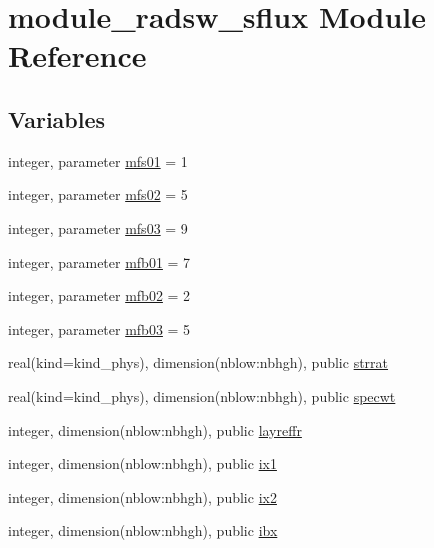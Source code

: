 \hypertarget{namespacemodule__radsw__sflux}{}\section{module\+\_\+radsw\+\_\+sflux Module Reference}
\label{namespacemodule__radsw__sflux}
\subsection*{Variables}
\begin{DoxyCompactItemize}
\item 
integer, parameter \hyperlink{namespacemodule__radsw__sflux_aba08e6f9d4dccd130e87300e6fd0ed58}{mfs01} = 1
\item 
integer, parameter \hyperlink{group__module__radsw__main_gacca3bbc0dd125a3e8c3734c58c48e79b}{mfs02} = 5
\item 
integer, parameter \hyperlink{group__module__radsw__main_ga5bd55a5106ce82bd47250d38d9b8f22a}{mfs03} = 9
\item 
integer, parameter \hyperlink{group__module__radsw__main_ga08a0f1278962ac27634169ea7632bc70}{mfb01} = 7
\item 
integer, parameter \hyperlink{group__module__radsw__main_gafdf71cabed6ae0076d98ff0e563dbc61}{mfb02} = 2
\item 
integer, parameter \hyperlink{group__module__radsw__main_ga2e3b510d781c596fa0bb9b1359a988dd}{mfb03} = 5
\item 
real(kind=kind\+\_\+phys), dimension(nblow\+:nbhgh), public \hyperlink{group__module__radsw__main_gaee2a2275da028b0960c5c1c8a34f46cf}{strrat}
\item 
real(kind=kind\+\_\+phys), dimension(nblow\+:nbhgh), public \hyperlink{group__module__radsw__main_ga7d1a386e92555bcb09239ab098d8b398}{specwt}
\item 
integer, dimension(nblow\+:nbhgh), public \hyperlink{group__module__radsw__main_ga90c56da1bcadbea0b42e12487c1c1eec}{layreffr}
\item 
integer, dimension(nblow\+:nbhgh), public \hyperlink{group__module__radsw__main_gac2864b4501e9bc3804d45d14f4aab472}{ix1}
\item 
integer, dimension(nblow\+:nbhgh), public \hyperlink{group__module__radsw__main_ga92703c3e826f7e81267c6b7ae31ebe42}{ix2}
\item 
integer, dimension(nblow\+:nbhgh), public \hyperlink{group__module__radsw__main_gacb1498ecf044449dbe6d7a5630fdc375}{ibx}
\item 

\end{DoxyCompactItemize}
